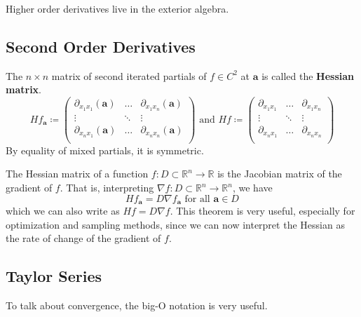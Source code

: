   \begin{corollary}
    Higher order derivatives live in the exterior algebra. 
  \end{corollary}

\subsection{Second Order Derivatives}

  \begin{definition}
    The $n \times n$ matrix of second iterated partials of $f \in C^2$ at $\mathbf{a}$ is called the \textbf{Hessian matrix}. 
    \[H f_\mathbf{a} \coloneqq \begin{pmatrix} 
    \partial_{x_1 x_1} (\mathbf{a}) & \ldots & \partial_{x_1 x_n} (\mathbf{a}) \\
    \vdots & \ddots & \vdots \\
    \partial_{x_n x_1} (\mathbf{a}) & \ldots & \partial_{x_n x_n} (\mathbf{a}) \\
    \end{pmatrix} \text{ and } H f \coloneqq \begin{pmatrix} 
    \partial_{x_1 x_1} & \ldots & \partial_{x_1 x_n} \\
    \vdots & \ddots & \vdots \\
    \partial_{x_n x_1} & \ldots & \partial_{x_n x_n} \\
    \end{pmatrix}\]
    By equality of mixed partials, it is symmetric. 
  \end{definition}

  \begin{theorem}
    The Hessian matrix of a function $f: D \subset \mathbb{R}^n \longrightarrow \mathbb{R}$ is the Jacobian matrix of the gradient of $f$. That is, interpreting $\nabla f: D \subset \mathbb{R}^n \longrightarrow \mathbb{R}^n$, we have
    \[H f_\mathbf{a} = D \nabla f_\mathbf{a} \text{ for all } \mathbf{a} \in D\]
    which we can also write as $H f = D \nabla f$. This theorem is very useful, especially for optimization and sampling methods, since we can now interpret the Hessian as the rate of change of the gradient of $f$. 
  \end{theorem}

\subsection{Taylor Series}

  To talk about convergence, the big-O notation is very useful. 

